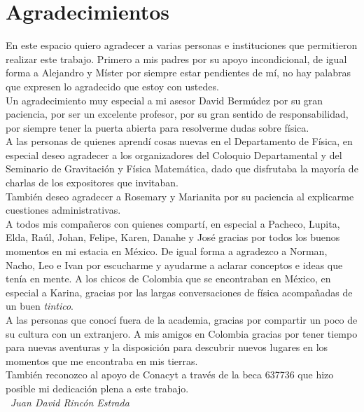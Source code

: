\chapter*{Agradecimientos}
En este espacio quiero agradecer a varias personas e instituciones que permitieron realizar este trabajo. Primero a mis padres por su apoyo incondicional, de igual forma a Alejandro y M\'{i}ster por siempre estar pendientes de m\'{i}, no hay palabras que expresen lo agradecido que estoy con ustedes.\\
Un agradecimiento muy especial a mi asesor David Berm\'{u}dez por su gran paciencia, por ser un excelente profesor, por su gran sentido de responsabilidad, por siempre tener la puerta abierta para resolverme dudas sobre f\'{i}sica.\\
A las personas de quienes aprend\'{i} cosas nuevas en el Departamento de F\'{i}sica, en especial deseo agradecer a los organizadores del Coloquio Departamental y del Seminario de Gravitaci\'{o}n y F\'{i}sica Matem\'{a}tica, dado que disfrutaba la mayor\'{i}a de charlas de los expositores que invitaban.\\
Tambi\'{e}n deseo agradecer a Rosemary y Marianita por su paciencia al explicarme cuestiones administrativas.\\
A todos mis compa\~{n}eros con quienes compart\'{i}, en especial a Pacheco, Lupita, Elda, Ra\'{u}l, Johan, Felipe, Karen, Danahe y Jos\'e gracias por todos los buenos momentos en mi estacia en M\'{e}xico. De igual forma a agradezco a Norman, Nacho, Leo e Ivan por escucharme y ayudarme a aclarar conceptos e ideas que ten\'{i}a en mente.  
A los chicos de Colombia que se encontraban en M\'{e}xico, en especial a Karina, gracias por las largas conversaciones de f\'{i}sica acompa\~{n}adas de un buen \textit{tintico}.\\
A las personas que conoc\'{i} fuera de la academia, gracias por compartir un poco de su cultura con un extranjero. A mis amigos en Colombia gracias por tener tiempo para nuevas aventuras y la disposici\'{o}n para descubrir nuevos lugares en los momentos que me encontraba en mis tierras.\\
Tambi\'{e}n reconozco al apoyo de Conacyt a trav\'{e}s de la beca 637736 que hizo posible mi dedicaci\'{o}n plena a este trabajo.\\

\ \hfill \textit{Juan David Rinc\'{o}n Estrada}